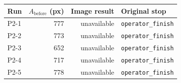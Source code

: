 \begin{tabular}{lrrl}
\toprule
Run & $A_{\mathrm{before}}$ (px) & Image result & Original stop \\
\midrule
P2-1 & 777 & unavailable & \texttt{operator\_finish} \\
P2-2 & 773 & unavailable & \texttt{operator\_finish} \\
P2-3 & 652 & unavailable & \texttt{operator\_finish} \\
P2-4 & 717 & unavailable & \texttt{operator\_finish} \\
P2-5 & 778 & unavailable & \texttt{operator\_finish} \\
\bottomrule
\end{tabular}
